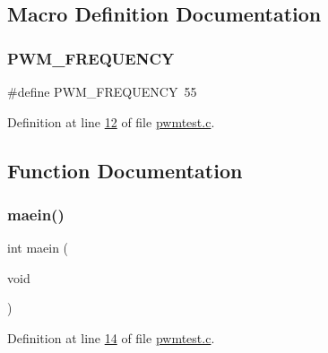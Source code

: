 \subsection{Macro Definition Documentation}
\mbox{\label{pwmtest_8c_a6177eb86ee16a1956c81749e4e332cf0}} 
\subsubsection{\texorpdfstring{PWM\_FREQUENCY}{PWM\_FREQUENCY}}
{\footnotesize\ttfamily \#define P\+W\+M\+\_\+\+F\+R\+E\+Q\+U\+E\+N\+CY~55}



Definition at line \mbox{\hyperlink{pwmtest_8c_source_l00012}{12}} of file \mbox{\hyperlink{pwmtest_8c_source}{pwmtest.\+c}}.



\subsection{Function Documentation}
\mbox{\label{pwmtest_8c_a318e1cba2e294d6cc5be9f5eb176644b}} 
\subsubsection{\texorpdfstring{maein()}{maein()}}
{\footnotesize\ttfamily int maein (\begin{DoxyParamCaption}\item[{void}]{ }\end{DoxyParamCaption})}



Definition at line \mbox{\hyperlink{pwmtest_8c_source_l00014}{14}} of file \mbox{\hyperlink{pwmtest_8c_source}{pwmtest.\+c}}.

